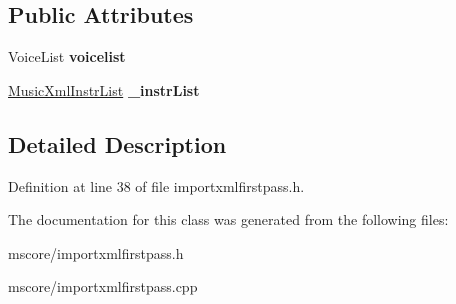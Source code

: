 \subsection*{Public Attributes}
\begin{DoxyCompactItemize}
\item 
\mbox{\label{class_ms_1_1_music_xml_part_a24facf232703cffe21426c149dc70cd3}} 
Voice\+List {\bfseries voicelist}
\item 
\mbox{\label{class_ms_1_1_music_xml_part_ad2b2806789c41bd758cae1f7b49c49ea}} 
\hyperlink{class_ms_1_1_music_xml_instr_list}{Music\+Xml\+Instr\+List} {\bfseries \+\_\+instr\+List}
\end{DoxyCompactItemize}


\subsection{Detailed Description}


Definition at line 38 of file importxmlfirstpass.\+h.



The documentation for this class was generated from the following files\+:\begin{DoxyCompactItemize}
\item 
mscore/importxmlfirstpass.\+h\item 
mscore/importxmlfirstpass.\+cpp\end{DoxyCompactItemize}
